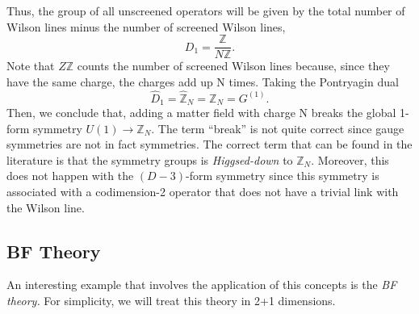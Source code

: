\documentclass{article}
\begin{document}
Thus, the group of all unscreened operators will be given by the total number of Wilson lines minus the number of screened Wilson lines,
\begin{equation}
	D_1=\frac{\mathbb{Z}}{N\mathbb{Z}}.
\end{equation}
Note that $Z\mathbb{Z}$ counts the number of screened Wilson lines because, since they have the same charge, the charges add up N times. Taking the Pontryagin dual 
\begin{equation}
	\widehat{D}_1=\widehat{\mathbb{Z}}_N=\mathbb{Z}_N=G^{(1)}. 
\end{equation}
Then, we conclude that, adding a matter field with charge N breaks the global 1-form symmetry $U(1)\to\mathbb{Z}_N$. The term ``break'' is not quite correct since gauge symmetries are not in fact symmetries. The correct term that can be found in the literature is that the symmetry groups is \textit{Higgsed-down} to $\mathbb{Z}_N$. Moreover, this does not happen with the $(D-3)$-form symmetry since this symmetry is associated with a codimension-2 operator that does not have a trivial link with the Wilson line. 
\subsection{BF Theory}
An interesting example that involves the application of this concepts is the \textit{BF theory.} For simplicity, we will treat this theory in 2+1 dimensions. 
\end{document}
